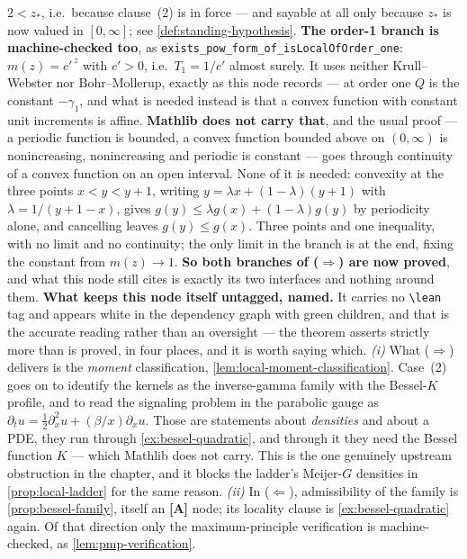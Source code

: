 \begin{theorem}
{$2 < z_*$, i.e.\ because clause~(2) is in force --- and sayable at all only because $z_*$ is now
valued in $[0,\infty]$; see \ref{def:standing-hypothesis}.
\textbf{The order-1 branch is machine-checked too}, as
\texttt{exists\_pow\_form\_of\_isLocalOfOrder\_one}: $m(z) = c'^{\,z}$ with $c' > 0$, i.e.\
$T_1 = 1/c'$ almost surely. It uses neither Krull--Webster nor Bohr--Mollerup, exactly as this
node records --- at order one $Q$ is the constant $-\gamma_1$, and what is needed instead is that
a convex function with constant unit increments is affine. \textbf{Mathlib does not carry that},
and the usual proof --- a periodic function is bounded, a convex function bounded above on
$(0,\infty)$ is nonincreasing, nonincreasing and periodic is constant --- goes through continuity
of a convex function on an open interval. None of it is needed: convexity at the three points
$x < y < y+1$, writing $y = \lambda x + (1-\lambda)(y+1)$ with $\lambda = 1/(y+1-x)$, gives
$g(y) \le \lambda g(x) + (1-\lambda)g(y)$ by periodicity alone, and cancelling leaves
$g(y) \le g(x)$. Three points and one inequality, with no limit and no continuity; the only limit
in the branch is at the end, fixing the constant from $m(z) \to 1$.
\textbf{So both branches of ($\Rightarrow$) are now proved}, and what this node still cites is
exactly its two interfaces and nothing around them.
\textbf{What keeps this node itself untagged, named.} It carries no \texttt{\textbackslash lean}
tag and appears white in the dependency graph with green children, and that is the accurate
reading rather than an oversight --- the theorem asserts strictly more than is proved, in four
places, and it is worth saying which.
\emph{(i)} What ($\Rightarrow$) delivers is the \emph{moment} classification,
\ref{lem:local-moment-classification}. Case~(2) goes on to identify the kernels as the
inverse-gamma family with the Bessel-$K$ profile, and to read the signaling problem in the
parabolic gauge as $\partial_t u = \tfrac12\partial_x^2u + (\beta/x)\partial_xu$. Those are
statements about \emph{densities} and about a PDE, they run through
\ref{ex:bessel-quadratic}, and through it they need the Bessel function $K$ --- which Mathlib does
not carry. This is the one genuinely upstream obstruction in the chapter, and it blocks the
ladder's Meijer-$G$ densities in \ref{prop:local-ladder} for the same reason.
\emph{(ii)} In ($\Leftarrow$), admissibility of the family is \ref{prop:bessel-family}, itself an
\textbf{[A]} node; its locality clause is \ref{ex:bessel-quadratic} again. Of that direction only
the maximum-principle verification is machine-checked, as \ref{lem:pmp-verification}.
}
\end{theorem}
